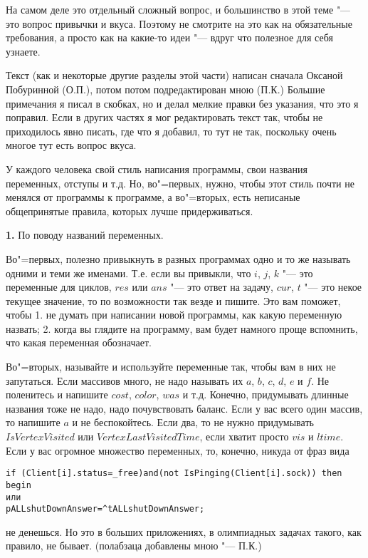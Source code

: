 На самом деле это отдельный сложный вопрос, и большинство в этой теме "--- это вопрос привычки и вкуса. Поэтому не смотрите на это как на обязательные требования, а просто как на какие-то идеи "--- вдруг что полезное для себя узнаете.

Текст (как и некоторые другие разделы этой части) написан сначала Оксаной Побуринной (О.П.), 
потом потом подредактирован мною (П.К.) Большие примечания я писал в скобках, 
но и делал мелкие правки без указания, что это я поправил. Если в других частях я мог 
редактировать текст так, чтобы не приходилось явно писать, где что я добавил, то тут не так, 
поскольку очень многое тут есть вопрос вкуса. 

У каждого человека свой стиль написания программы, свои названия переменных, отступы и т.д. Но, во"=первых, 
нужно, чтобы этот стиль почти не менялся от программы к программе, а во"=вторых, есть неписаные общепринятые 
правила, которых лучше придерживаться. 

\textbf{1.} По поводу названий переменных.

 Во"=первых, полезно привыкнуть в разных программах одно и 
то же называть одними и теми же 
именами. Т.е. если вы привыкли, что $i$, $j$, $k$ "--- это переменные для циклов, $res$ или $ans$ "--- это ответ на задачу,
$cur$, $t$ "--- это некое текущее значение, то по возможности так везде и пишите. Это вам поможет, 
чтобы 1. не думать при написании новой программы, как какую переменную назвать; 2. когда вы глядите на 
программу, вам будет намного проще вспомнить, что какая переменная обозначает.

Во"=вторых, называйте и используйте переменные так, чтобы вам в них не запутаться. Если массивов 
много, не надо называть их $a$, $b$, $c$, $d$, $e$ и $f$. Не  
поленитесь и напишите $cost$, $color$, $was$ и т.д. Конечно, придумывать длинные названия тоже не 
надо, надо почувствовать баланс. Если у вас всего один массив, то напишите $a$ и не беспокойтесь. 
Если два, то не нужно придумывать $IsVertexVisited$ или $VertexLastVisitedTime$, если хватит просто 
$vis$ и $ltime$. Если у вас огромное множество переменных, то, конечно, никуда от фраз вида
\begin{codesampleo}\begin{verbatim}
if (Client[i].status=_free)and(not IsPinging(Client[i].sock)) then begin
или
pALLshutDownAnswer=^tALLshutDownAnswer;
\end{verbatim}
\end{codesampleo}
\noindent не денешься. Но это в больших приложениях, в олимпиадных задачах такого, как правило, не бывает. (полабзаца 
добавлены мною "--- П.К.)

